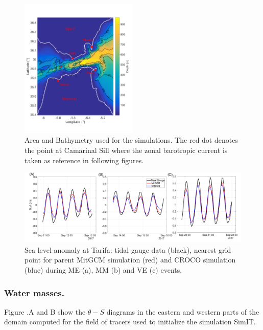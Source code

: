 \begin{figure}[!h]
        \centering
        \includegraphics[width=0.5\textwidth]{./GBR3D/FigBathyVHR.png}
        \caption[Area and Bathymetry used for the simulations.]{Area and Bathymetry used for the simulations. The red dot denotes the point at Camarinal Sill where the zonal barotropic current is taken as reference in following figures.}
        \label{FigBathy3D}
\end{figure}

\begin{figure}[!h]
        \includegraphics[width=\textwidth]{./GBR3D/SLA_Tarifa_ME2VE2IES.png}
        \caption[Sea level-anomaly at Tarifa.]{Sea level-anomaly at Tarifa: tidal gauge data (black), nearest grid point for parent MitGCM simulation (red) and CROCO simulation (blue) during ME (a), MM (b) and VE (c) events.}
        \label{fig_maree_tar}
\end{figure}

\subsubsection{Water masses.}
\label{sectionWaterMasses}
Figure .A and B show the $\theta-S$ diagrams in the eastern and western parts of the domain computed for the field of tracers used to initialize the simulation SimIT. 

